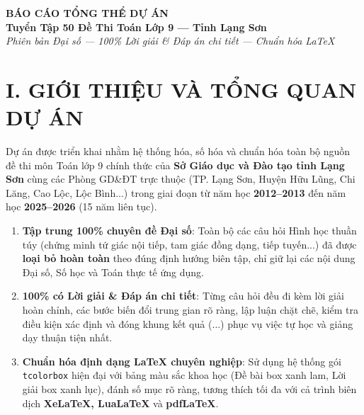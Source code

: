 ﻿%

\begin{tcolorbox}[
  enhanced,
  colback  = PrimaryBlue,
  colframe = PrimaryBlue!60!black,
  arc      = 5pt,
  boxrule  = 1.5pt,
  halign   = center,
  top=14pt, bottom=14pt, left=10pt, right=10pt
]
  {\color{white}\fontsize{18}{22}\selectfont\bfseries BÁO CÁO TỔNG THỂ DỰ ÁN}\\[5pt]
  {\color{white!90!gray}\large\bfseries Tuyển Tập 50 Đề Thi Toán Lớp 9 — Tỉnh Lạng Sơn}\\[4pt]
  {\color{white!70!gray}\normalsize\itshape Phiên bản Đại số — 100\% Lời giải \& Đáp án chi tiết — Chuẩn hóa \LaTeX{}}
\end{tcolorbox}

\vspace{0.3cm}

\section*{I. GIỚI THIỆU VÀ TỔNG QUAN DỰ ÁN}
Dự án được triển khai nhằm hệ thống hóa, số hóa và chuẩn hóa toàn bộ nguồn đề thi môn Toán lớp 9 chính thức của \textbf{Sở Giáo dục và Đào tạo tỉnh Lạng Sơn} cùng các Phòng GD\&ĐT trực thuộc (TP. Lạng Sơn, Huyện Hữu Lũng, Chi Lăng, Cao Lộc, Lộc Bình...) trong giai đoạn từ năm học \textbf{2012--2013} đến năm học \textbf{2025--2026} (15 năm liên tục).

\begin{tcolorbox}[colback=LightBlueShade,colframe=SecondaryBlue,arc=4pt,boxrule=0.8pt,title={\bfseries Mục tiêu cốt lõi \& Điểm nổi bật của bộ tài liệu}]
\begin{enumerate}[label=\textbf{\arabic*.}]
  \item \textbf{Tập trung 100\% chuyên đề Đại số}: Toàn bộ các câu hỏi Hình học thuần túy (chứng minh tứ giác nội tiếp, tam giác đồng dạng, tiếp tuyến...) đã được \textbf{loại bỏ hoàn toàn} theo đúng định hướng biên tập, chỉ giữ lại các nội dung Đại số, Số học và Toán thực tế ứng dụng.
  \item \textbf{100\% có Lời giải \& Đáp án chi tiết}: Từng câu hỏi đều đi kèm lời giải hoàn chỉnh, các bước biến đổi trung gian rõ ràng, lập luận chặt chẽ, kiểm tra điều kiện xác định và đóng khung kết quả ($\boxed{\dots}$) phục vụ việc tự học và giảng dạy thuận tiện nhất.
  \item \textbf{Chuẩn hóa định dạng LaTeX chuyên nghiệp}: Sử dụng hệ thống gói \texttt{tcolorbox} hiện đại với bảng màu sắc khoa học (Đề bài box xanh lam, Lời giải box xanh lục), đánh số mục rõ ràng, tương thích tối đa với cả trình biên dịch \textbf{XeLaTeX, LuaLaTeX} và \textbf{pdfLaTeX}.
\end{enumerate}
\end{tcolorbox}

